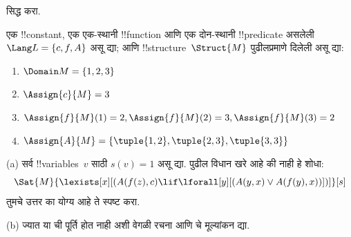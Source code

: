 \documentclass[../../../include/open-logic-section]{subfiles}
\begin{document}
\begin{prob}
   सिद्ध करा.
\end{prob}
\tagendprob

\begin{prob}
एक !!{constant}, एक एक-स्थानी !!{function} आणि एक दोन-स्थानी
!!{predicate} असलेली $\Lang L = \{c, f, A\}$ असू द्या; आणि
!!{structure}~$\Struct{M}$ पुढीलप्रमाणे दिलेली असू द्या:
\begin{enumerate}
\item $\Domain M = \{1, 2, 3\}$
\item $\Assign{c}{M} = 3$
\item $\Assign{f}{M}(1) = 2, \Assign{f}{M}(2) = 3, \Assign{f}{M}(3) = 2$
\item $\Assign{A}{M} = \{\tuple{1, 2}, \tuple{2, 3}, \tuple{3, 3}\}$
\end{enumerate}
(a) सर्व !!{variable}s~$v$ साठी $s(v) = 1$ असू द्या. पुढील विधान
खरे आहे की नाही हे शोधा:
\[
\Sat{M}{\lexists[x][(A(f(z), c) \lif \lforall[y][(A(y, x) \lor A(f(y),
      x))])]}[s]
\]
तुमचे उत्तर का योग्य आहे ते स्पष्ट करा.

(b) ज्यात या ची पूर्ति होत नाही अशी वेगळी रचना आणि
चे मूल्यांकन द्या.
\end{prob}
\end{document}
